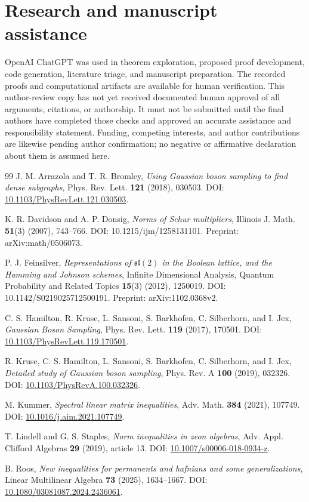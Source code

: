 \documentclass[11pt]{article}
\theoremstyle{remark}\newtheorem{remark}[theorem]{Remark}
\begin{document}
\section*{Research and manuscript assistance}
OpenAI ChatGPT was used in theorem exploration, proposed proof development,
code generation, literature triage, and manuscript preparation. The recorded
proofs and computational artifacts are available for human verification.
This author-review copy has not yet received documented human approval of
all arguments, citations, or authorship. It must not be submitted until the
final authors have completed those checks and approved an accurate assistance
and responsibility statement. Funding, competing interests, and author
contributions are likewise pending author confirmation; no negative
or affirmative declaration about them is assumed here.

\begin{thebibliography}{99}
J. M. Arrazola and T. R. Bromley,
\emph{Using Gaussian boson sampling to find dense subgraphs},
Phys. Rev. Lett. \textbf{121} (2018), 030503.
DOI: \href{https://doi.org/10.1103/PhysRevLett.121.030503}{10.1103/PhysRevLett.121.030503}.

K. R. Davidson and A. P. Donsig,
\emph{Norms of Schur multipliers},
Illinois J. Math. \textbf{51}(3) (2007), 743--766.
DOI: 10.1215/ijm/1258131101. Preprint: arXiv:math/0506073.

P. J. Feinsilver,
\emph{Representations of $\mathfrak{sl}(2)$ in the Boolean lattice, and the Hamming and Johnson schemes},
Infinite Dimensional Analysis, Quantum Probability and Related Topics
\textbf{15}(3) (2012), 1250019. DOI: 10.1142/S0219025712500191.
Preprint: arXiv:1102.0368v2.

C. S. Hamilton, R. Kruse, L. Sansoni, S. Barkhofen, C. Silberhorn, and I. Jex,
\emph{Gaussian Boson Sampling},
Phys. Rev. Lett. \textbf{119} (2017), 170501.
DOI: \href{https://doi.org/10.1103/PhysRevLett.119.170501}{10.1103/PhysRevLett.119.170501}.

R. Kruse, C. S. Hamilton, L. Sansoni, S. Barkhofen, C. Silberhorn, and I. Jex,
\emph{Detailed study of Gaussian boson sampling},
Phys. Rev. A \textbf{100} (2019), 032326.
DOI: \href{https://doi.org/10.1103/PhysRevA.100.032326}{10.1103/PhysRevA.100.032326}.

M. Kummer, \emph{Spectral linear matrix inequalities},
Adv. Math. \textbf{384} (2021), 107749.
DOI: \href{https://doi.org/10.1016/j.aim.2021.107749}{10.1016/j.aim.2021.107749}.

T. Lindell and G. S. Staples,
\emph{Norm inequalities in zeon algebras},
Adv. Appl. Clifford Algebras \textbf{29} (2019), article 13.
DOI: \href{https://doi.org/10.1007/s00006-018-0934-z}{10.1007/s00006-018-0934-z}.

B. Roos, \emph{New inequalities for permanents and hafnians and some generalizations},
Linear Multilinear Algebra \textbf{73} (2025), 1634--1667.
DOI: \href{https://doi.org/10.1080/03081087.2024.2436061}{10.1080/03081087.2024.2436061}.
\end{thebibliography}
\end{document}
